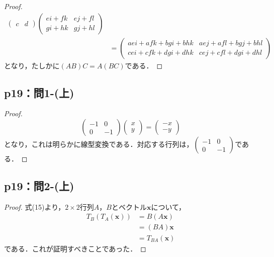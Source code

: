\documentclass[uplatex,dvipdfmx,a4paper,11pt,fleqn]{jsarticle}
\begin{document}
\begin{tleftbar}
\begin{proof}
\begin{align*}
\begin{pmatrix}
                    c & d
                \end{pmatrix}
                \begin{pmatrix}
                    ei + fk & ej +fl \\
                    gi + hk & gj +hl 
                \end{pmatrix}
                \\
                & =
                \begin{pmatrix}
                    aei + afk +bgi +bhk & aej +afl +bgj +bhl \\
                    cei + cfk + dgi +dhk & cej + cfl + dgi +dhl
                \end{pmatrix}
            \end{align*}
            となり，たしかに$(AB)C=A(BC)$である．
        \end{proof}
    \end{tleftbar}
%
\newpage
\subsection*{p19：問1-(上)}
%
\begin{tleftbar}
	\begin{proof}
		\[
			\begin{pmatrix}
				-1 & 0\\
				0 & -1
			\end{pmatrix}
				\begin{pmatrix}
					x \\
					y 
				\end{pmatrix}
			=
				\begin{pmatrix}
					-x \\
					-y 
				\end{pmatrix}
			\]
			となり，これは明らかに線型変換である．対応する行列は，$
			\begin{pmatrix}
				-1 & 0 \\
				0 & -1
			\end{pmatrix}
			$である．
		\end{proof}
	\end{tleftbar}

    \subsection*{p19：問2-(上)}
	\begin{tleftbar}
		\begin{proof}
			式(15)より，$2 \times 2$行列$A$，$B$とベクトル$\bm{x}$について，
			\begin{align*}
				T_B (T_A (\bm{x})) &= B(A\bm{x}) \\
				& = (BA) \bm{x} \\
				& = T_{BA} (\bm{x})
			\end{align*}
			である．これが証明すべきことであった．
		\end{proof}
    \end{tleftbar}
\end{document}
